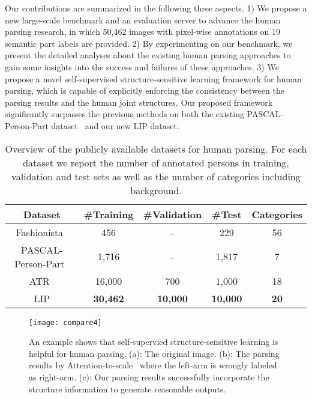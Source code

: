 \documentclass[10pt,twocolumn,letterpaper]{article}
\begin{document}
Our  contributions are summarized in the following three aspects. 1) We propose a new large-scale benchmark and an evaluation server to advance the human parsing research, in which 50,462 images with pixel-wise annotations on 19 semantic part labels are provided. 2) By experimenting on our benchmark, we present the detailed analyses about the existing human parsing approaches to gain some insights into the success and failures of these approaches. 3) We propose a novel self-supervised structure-sensitive learning framework for human parsing, which is capable of explicitly enforcing the consistency between the parsing results and the human joint structures. Our proposed framework significantly surpasses the previous methods on both the existing PASCAL-Person-Part dataset~\cite{chen2014detect} and our new LIP dataset.

\begin{table}[]
\centering
\scriptsize
\begin{tabular}{ccccc}
\toprule[0.7pt]
    Dataset                                & \#Training & \#Validation & \#Test & Categories \\ \hline 
    Fashionista~\cite{yamaguchi2012parsing}  & 456           & -           & 229       &     56   \\
    PASCAL-Person-Part~\cite{chen2014detect} & 1,716      & -            & 1,817     &     7      \\
    ATR~\cite{Co-CNN}                            & 16,000     & 700          & 1,000     &     18     \\ \hline
    LIP                                      & \textbf{30,462}     & \textbf{10,000}    & \textbf{10,000}    &   \textbf{20}      \\ 
\toprule[0.7pt]
\end{tabular}
\vspace{-4mm}
\caption{Overview of the publicly available datasets for human parsing. For each dataset we report the number of annotated persons in training, validation and test sets as well as the number of categories including background.}
\label{tab:dataset_num}
\vspace{-6mm}
\end{table}

\begin{figure}[]
\centering
   \texttt{[image: compare4]}
\vspace{-3mm}
\caption{An example shows that self-supervied structure-sensitive learning is helpful for human parsing. (a): The original image. (b): The parsing results by Attention-to-scale~\cite{chen2015attention} where the left-arm is wrongly labeled as right-arm. (c): Our parsing results successfully incorporate the structure information to generate reasonable outputs.}
\label{fig: example_compare}
\vspace{-6mm}
\end{figure}
\end{document}
